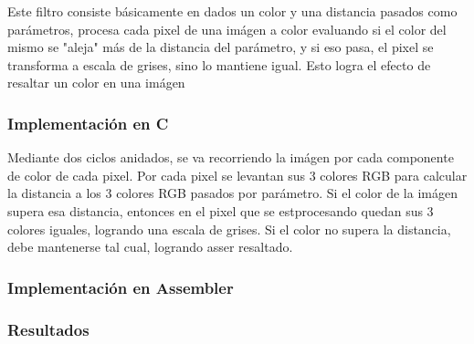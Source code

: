 Este filtro consiste b\'asicamente en dados un color y una distancia pasados como par\'ametros, procesa cada pixel de una im\'agen a color evaluando si el color del mismo se "aleja" m\'as de la distancia del par\'ametro, y si eso pasa, el pixel se transforma a escala de grises, sino lo mantiene igual. Esto logra el efecto de resaltar un color en una im\'agen

\subsubsection{Implementación en C}
Mediante dos ciclos anidados, se va recorriendo la im\'agen por cada componente de color de cada pixel. Por cada pixel se levantan sus 3 colores RGB para calcular la distancia a los 3 colores RGB pasados por par\'ametro. Si el color de la im\'agen supera esa distancia, entonces en el pixel que se est\á procesando quedan sus 3 colores iguales, logrando una escala de grises. Si el color no supera la distancia, debe mantenerse tal cual, logrando as\í ser resaltado.

\subsubsection{Implementación en Assembler}


\subsubsection{Resultados}
